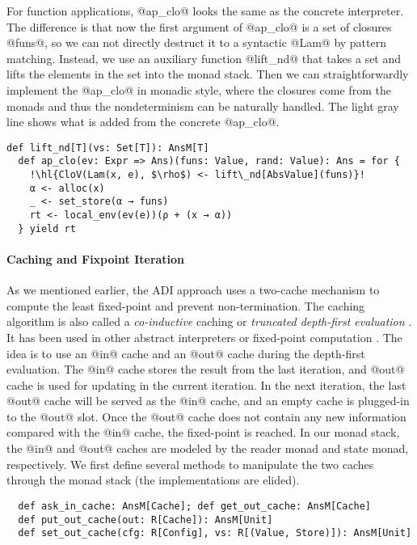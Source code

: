 For function applications, @ap_clo@ looks the same as the concrete interpreter.
The difference is that now the first argument of @ap_clo@ is a set of closures
@funs@, so we can not directly destruct it to a syntactic @Lam@ by pattern
matching. Instead, we use an auxiliary function @lift_nd@ that takes a set and
lifts the elements in the set into the monad stack. Then we can
straightforwardly implement the @ap_clo@ in monadic style, where the closures
come from the monads and thus the nondeterminism can be naturally handled. The
light gray line shows what is added from the concrete @ap_clo@.
\begin{lstlisting}[escapechar=!]
  def lift_nd[T](vs: Set[T]): AnsM[T]
  def ap_clo(ev: Expr => Ans)(funs: Value, rand: Value): Ans = for {
    !\hl{CloV(Lam(x, e), $\rho$) <- lift\_nd[AbsValue](funs)}!
    α <- alloc(x)
    _ <- set_store(α → funs)
    rt <- local_env(ev(e))(ρ + (x → α))
  } yield rt
\end{lstlisting}

\paragraph{Caching and Fixpoint Iteration}
As we mentioned earlier, the ADI approach uses a two-cache mechanism to
compute the least fixed-point and prevent non-termination.
The caching algorithm is also called a \textit{co-inductive} caching or
\textit{truncated depth-first evaluation} \cite{Rosendahl:AbsIntPL}. It has
been used in other abstract interpreters or fixed-point computation
\cite{DBLP:journals/pacmpl/DaraisLNH17, Wei:2018:RAA:3243631.3236800,
  Rosendahl:AbsIntPL}. The idea is to use an @in@ cache and an @out@ cache during
the depth-first evaluation. The @in@ cache stores the result from the last
iteration, and @out@ cache is used for updating in the current iteration. In
the next iteration, the last @out@ cache will be served as the @in@ cache, and
an empty cache is plugged-in to the @out@ slot. Once the @out@ cache does not
contain any new information compared with the @in@ cache, the fixed-point is
reached.
In our monad stack, the @in@ and @out@ caches are modeled by the reader monad and
state monad, respectively. We first define several methods to manipulate
the two caches through the monad stack (the implementations are elided).
\begin{lstlisting}
  def ask_in_cache: AnsM[Cache]; def get_out_cache: AnsM[Cache]
  def put_out_cache(out: R[Cache]): AnsM[Unit]
  def set_out_cache(cfg: R[Config], vs: R[(Value, Store)]): AnsM[Unit]
\end{lstlisting}

